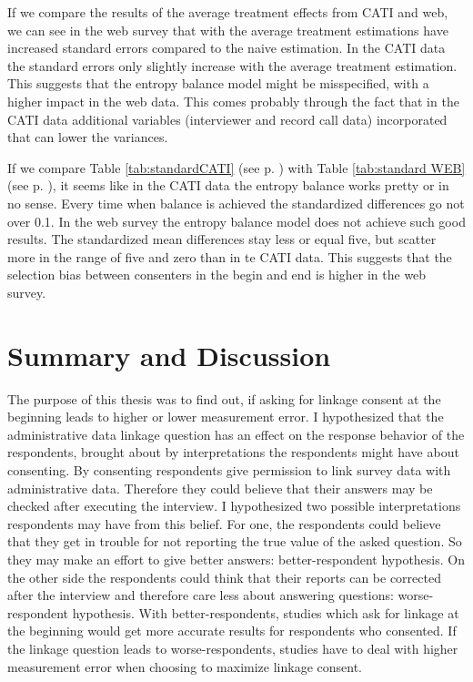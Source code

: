 If we compare the results of the average treatment effects from CATI and web, we can see in the web survey that with the average treatment estimations have increased standard errors compared to the naive estimation. In the CATI data the standard errors only slightly increase with the average treatment estimation. This suggests that the entropy balance model might be misspecified, with a higher impact in the web data. This comes probably through the fact that in the CATI data additional variables (interviewer and record call data) incorporated that can lower the variances. 

If we compare Table \ref*{tab:standardCATI} (see p. \pageref*{tab:standard WEB}) with Table \ref*{tab:standard WEB} (see p. \pageref*{tab:standard WEB}), it seems like in the CATI data the entropy balance works pretty or in no sense. Every time when balance is achieved the standardized differences go not over 0.1. In the web survey the entropy balance model does not achieve such good results. The standardized mean differences stay less or equal five, but scatter more in the range of five and zero than in te CATI data. This suggests that the selection bias between consenters in the begin and end is higher in the web survey.

\section{Summary and Discussion}

The purpose of this thesis was to find out, if asking for linkage consent at the beginning leads to higher or lower measurement error. I hypothesized that the administrative data linkage question has an effect on the response behavior of the respondents, brought about by interpretations the respondents might have about consenting. By consenting respondents give permission to link survey data with administrative data. Therefore they could believe that their answers may be checked after executing the interview. I hypothesized two possible interpretations respondents may have from this belief. For one, the respondents could believe that they get in trouble for not reporting the true value of the asked question. So they may make an effort to give better answers: better-respondent hypothesis. On the other side the respondents could think that their reports can be corrected after the interview and therefore care less about answering questions: worse-respondent hypothesis. With better-respondents, studies which ask for linkage at the beginning would get more accurate results for respondents who consented. If the linkage question leads to worse-respondents, studies have to deal with higher measurement error when choosing to maximize linkage consent. 

